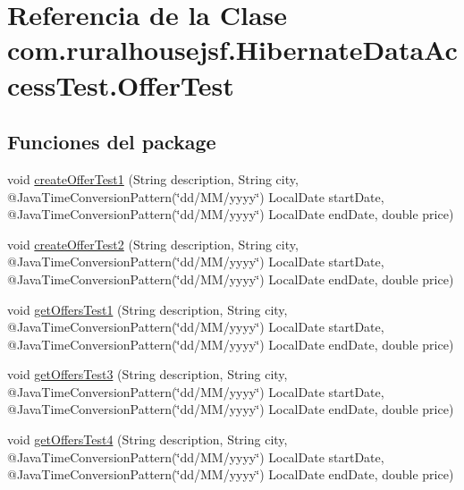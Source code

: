 \hypertarget{classcom_1_1ruralhousejsf_1_1_hibernate_data_access_test_1_1_offer_test}{}\section{Referencia de la Clase com.\+ruralhousejsf.\+Hibernate\+Data\+Access\+Test.\+Offer\+Test}
\label{classcom_1_1ruralhousejsf_1_1_hibernate_data_access_test_1_1_offer_test}
\subsection*{Funciones del \textquotesingle{}package\textquotesingle{}}
\begin{DoxyCompactItemize}
\item 
void \mbox{\hyperlink{classcom_1_1ruralhousejsf_1_1_hibernate_data_access_test_1_1_offer_test_a31d91d48cc672d2bb9739439c22eb213}{create\+Offer\+Test1}} (String description, String city, @Java\+Time\+Conversion\+Pattern(\char`\"{}dd/MM/yyyy\char`\"{}) Local\+Date start\+Date, @Java\+Time\+Conversion\+Pattern(\char`\"{}dd/MM/yyyy\char`\"{}) Local\+Date end\+Date, double price)
\item 
void \mbox{\hyperlink{classcom_1_1ruralhousejsf_1_1_hibernate_data_access_test_1_1_offer_test_a7f6665553642218567a9fd143c76a380}{create\+Offer\+Test2}} (String description, String city, @Java\+Time\+Conversion\+Pattern(\char`\"{}dd/MM/yyyy\char`\"{}) Local\+Date start\+Date, @Java\+Time\+Conversion\+Pattern(\char`\"{}dd/MM/yyyy\char`\"{}) Local\+Date end\+Date, double price)
\item 
void \mbox{\hyperlink{classcom_1_1ruralhousejsf_1_1_hibernate_data_access_test_1_1_offer_test_a5dc313dbb4fff4fd5e84b251acdddf05}{get\+Offers\+Test1}} (String description, String city, @Java\+Time\+Conversion\+Pattern(\char`\"{}dd/MM/yyyy\char`\"{}) Local\+Date start\+Date, @Java\+Time\+Conversion\+Pattern(\char`\"{}dd/MM/yyyy\char`\"{}) Local\+Date end\+Date, double price)
\item 
void \mbox{\hyperlink{classcom_1_1ruralhousejsf_1_1_hibernate_data_access_test_1_1_offer_test_ae7bee5891a0a3f569bc703193f0050a7}{get\+Offers\+Test3}} (String description, String city, @Java\+Time\+Conversion\+Pattern(\char`\"{}dd/MM/yyyy\char`\"{}) Local\+Date start\+Date, @Java\+Time\+Conversion\+Pattern(\char`\"{}dd/MM/yyyy\char`\"{}) Local\+Date end\+Date, double price)
\item 
void \mbox{\hyperlink{classcom_1_1ruralhousejsf_1_1_hibernate_data_access_test_1_1_offer_test_ad7d2deaa29db9f8cb13d0fbacb073223}{get\+Offers\+Test4}} (String description, String city, @Java\+Time\+Conversion\+Pattern(\char`\"{}dd/MM/yyyy\char`\"{}) Local\+Date start\+Date, @Java\+Time\+Conversion\+Pattern(\char`\"{}dd/MM/yyyy\char`\"{}) Local\+Date end\+Date, double price)
\end{DoxyCompactItemize}


